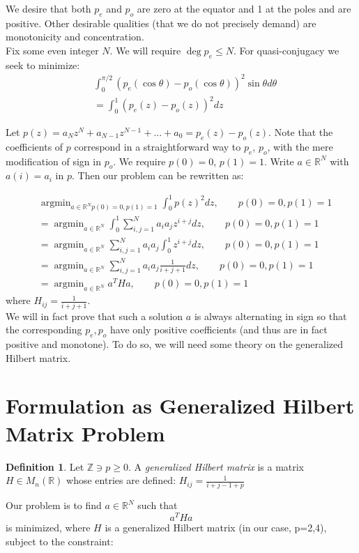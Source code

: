 \documentclass[11pt]{article}
\theoremstyle{definition}
\newtheorem{defn}[thm]{Definition}
\theoremstyle{remark}
\numberwithin{equation}{section}
\DeclareMathOperator{\argmin}{argmin}
\begin{document}
We desire that both $p_e$ and $p_o$ are zero at the equator and 1 at the poles and are positive. Other desirable qualities (that we do not precisely demand) are monotonicity and concentration.\\

Fix some even integer $N$. We will require $\deg p_e \le N$. For quasi-conjugacy we seek to minimize: 
\begin{align}
&\int_0^{\pi/2} (p_e(\cos\theta) - p_o(\cos\theta))^2 \sin\theta d\theta\\ \label{quasiconjugacy-poly-formulation}
&= \int_0^1 (p_e(z) - p_o(z))^2 dz
\end{align}

Let $p(z) = a_Nz^N + a_{N-1}z^{N-1} + ... + a_0 = p_e(z) - p_o(z)$. Note that the coefficients of $p$ correspond in a straightforward way to $p_e$, $p_o$, with the mere modification of sign in $p_o$. We require $p(0) = 0$, $p(1) = 1$. Write $a\in \mathbb{R}^N$ with $a(i) = a_i$ in $p$. Then our problem can be rewritten as: 

\begin{align*}
& \argmin_{a\in\mathbb{R}^N p(0)=0,p(1)=1} \int_0^1 p(z)^2 dz, \qquad p(0)=0, p(1)=1 \\
&=\argmin_{a\in\mathbb{R}^N} \int_0^1 \sum_{i,j=1}^N a_ia_j z^{i+j} dz, \qquad p(0)=0, p(1)=1\\
&= \argmin_{a\in\mathbb{R}^N} \sum_{i,j=1}^N a_ia_j \int_0^1 z^{i+j} dz, \qquad p(0)=0, p(1)=1\\
&= \argmin_{a\in\mathbb{R}^N} \sum_{i,j=1}^N a_ia_j \frac{1}{i+j+1} dz, \qquad p(0)=0, p(1)=1\\
&= \argmin_{a\in\mathbb{R}^N} a^T H a, \qquad p(0)=0, p(1)=1
\end{align*} where $H_{ij} = \frac{1}{i+j+1}$. \\

We will in fact prove that such a solution $a$ is always alternating in sign so that the corresponding $p_e, p_o$ have only positive coefficients (and thus are in fact positive and monotone). To do so, we will need some theory on the generalized Hilbert matrix. 

\section{Formulation as Generalized Hilbert Matrix Problem}\label{formulation-hilbert}
\begin{defn} 
Let $\mathbb{Z} \ni p \ge 0$. A \emph{generalized Hilbert matrix} is a matrix $H\in M_n(\mathbb{R})$ whose entries are defined: 
$H_{ij} = \frac{1}{i+j-1+p}$
\end{defn}
Our problem is to find $a\in\mathbb{R}^N$ such that 
\begin{equation}
a^T H a\end{equation}
is minimized, where $H$ is a generalized Hilbert matrix (in our case, p=2,4), subject to the constraint: 
\end{document}
